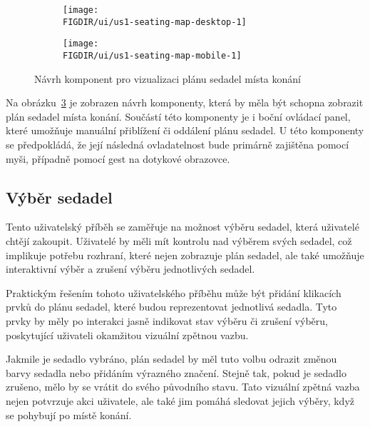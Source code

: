 \begin{figure}[H]
    \centering
    \begin{subfigure}{0.775\textwidth}
        \texttt{[image: \\FIGDIR/ui/us1-seating-map-desktop-1]}
        \label{fig:us1-seating-map-desktop-1}
    \end{subfigure}
    \begin{subfigure}{0.2\textwidth}
        \texttt{[image: \\FIGDIR/ui/us1-seating-map-mobile-1]}
        \label{fig:us1-seating-map-mobile-1}
    \end{subfigure}
    \caption{Návrh komponent pro vizualizaci plánu sedadel místa konání}
    \label{fig:us1-seating-map}
\end{figure}

Na obrázku~\ref{fig:us1-seating-map} je zobrazen návrh komponenty, která by měla být schopna zobrazit plán sedadel místa konání.
Součástí této komponenty je i boční ovládací panel, které umožňuje manuální přiblížení či oddálení plánu sedadel.
U této komponenty se předpokládá, že její následná ovladatelnost bude primárně zajištěna pomocí myši, případně pomocí gest na dotykové obrazovce.

\subsection{Výběr sedadel}
\label{subsec:narvh-ui-transformace-uzivatelskych-pribehu-vyber-sedadel}
\userstoryseatselection

Tento uživatelský příběh se zaměřuje na možnost výběru sedadel, která uživatelé chtějí zakoupit.
Uživatelé by měli mít kontrolu nad výběrem svých sedadel, což implikuje potřebu rozhraní, které nejen zobrazuje plán sedadel, ale také umožňuje interaktivní výběr a zrušení výběru jednotlivých sedadel.

Praktickým řešením tohoto uživatelského příběhu může být přidání klikacích prvků do plánu sedadel, které budou reprezentovat jednotlivá sedadla.
Tyto prvky by měly po interakci jasně indikovat stav výběru či zrušení výběru, poskytující uživateli okamžitou vizuální zpětnou vazbu.

Jakmile je sedadlo vybráno, plán sedadel by měl tuto volbu odrazit změnou barvy sedadla nebo přidáním výrazného značení.
Stejně tak, pokud je sedadlo zrušeno, mělo by se vrátit do svého původního stavu.
Tato vizuální zpětná vazba nejen potvrzuje akci uživatele, ale také jim pomáhá sledovat jejich výběry, když se pohybují po místě konání.

